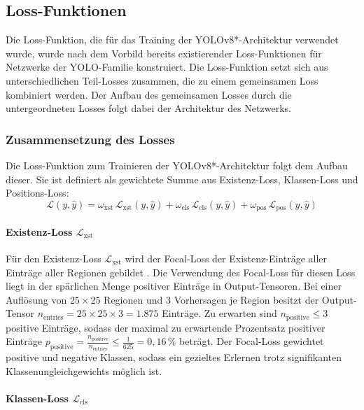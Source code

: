 
\subsection{Loss-Funktionen}
\label{sec:losses}

Die Loss-Funktion, die für das Training der YOLOv8*-Architektur verwendet wurde, wurde nach dem Vorbild bereits existierender Loss-Funktionen für Netzwerke der YOLO-Familie konstruiert. Die Loss-Funktion setzt sich aus unterschiedlichen Teil-Losses zusammen, die zu einem gemeinsamen Loss kombiniert werden. Der Aufbau des gemeinsamen Losses durch die untergeordneten Losses folgt dabei der Architektur des Netzwerks.

\subsubsection{Zusammensetzung des Losses}

Die Loss-Funktion zum Trainieren der YOLOv8*-Architektur folgt dem Aufbau dieser. Sie ist definiert als gewichtete Summe aus Existenz-Loss, Klassen-Loss und Positions-Loss:
\[ \mathcal{L}(y, \hat{y}) = \omega_\text{xst}\,\mathcal{L}_\text{xst}(y, \hat{y}) + \omega_\text{cls}\,\mathcal{L}_\text{cls}(y, \hat{y}) + \omega_\text{pos}\,\mathcal{L}_\text{pos}(y, \hat{y}) \]
\paragraph{Existenz-Loss $\mathcal{L}_\text{xst}$}

Für den Existenz-Loss $\mathcal{L}_\text{xst}$ wird der Focal-Loss der Existenz-Einträge aller Einträge aller Regionen gebildet \cite{focal_loss}. Die Verwendung des Focal-Loss für diesen Loss liegt in der spärlichen Menge positiver Einträge in Output-Tensoren. Bei einer Auflösung von $25 \times 25$ Regionen und 3 Vorhersagen je Region besitzt der Output-Tensor $n_\text{entries} = 25 \times 25 \times 3 = 1.875$ Einträge. Zu erwarten sind $ n_\text{positive} \leq 3 $ positive Einträge, sodass der maximal zu erwartende Prozentsatz positiver Einträge $p_\text{positive} = \frac{n_\text{positive}}{n_\text{entries}} \leq \frac{1}{625} = 0,16\,\%$ beträgt. Der Focal-Loss gewichtet positive und negative Klassen, sodass ein gezieltes Erlernen trotz signifikanten Klassenungleichgewichts möglich ist.

\paragraph{Klassen-Loss $\mathcal{L}_\text{cls}$}

